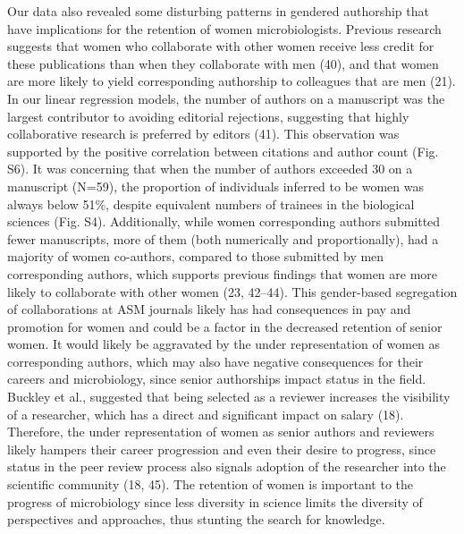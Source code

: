 \documentclass[11pt,]{article}
\begin{document}
Our data also revealed some disturbing patterns in gendered authorship
that have implications for the retention of women microbiologists.
Previous research suggests that women who collaborate with other women
receive less credit for these publications than when they collaborate
with men (40), and that women are more likely to yield corresponding
authorship to colleagues that are men (21). In our linear regression
models, the number of authors on a manuscript was the largest
contributor to avoiding editorial rejections, suggesting that highly
collaborative research is preferred by editors (41). This observation
was supported by the positive correlation between citations and author
count (Fig. S6). It was concerning that when the number of authors
exceeded 30 on a manuscript (N=59), the proportion of individuals
inferred to be women was always below 51\%, despite equivalent numbers
of trainees in the biological sciences (Fig. S4). Additionally, while
women corresponding authors submitted fewer manuscripts, more of them
(both numerically and proportionally), had a majority of women
co-authors, compared to those submitted by men corresponding authors,
which supports previous findings that women are more likely to
collaborate with other women (23, 42--44). This gender-based segregation
of collaborations at ASM journals likely has had consequences in pay and
promotion for women and could be a factor in the decreased retention of
senior women. It would likely be aggravated by the under representation
of women as corresponding authors, which may also have negative
consequences for their careers and microbiology, since senior
authorships impact status in the field. Buckley et al., suggested that
being selected as a reviewer increases the visibility of a researcher,
which has a direct and significant impact on salary (18). Therefore, the
under representation of women as senior authors and reviewers likely
hampers their career progression and even their desire to progress,
since status in the peer review process also signals adoption of the
researcher into the scientific community (18, 45). The retention of
women is important to the progress of microbiology since less diversity
in science limits the diversity of perspectives and approaches, thus
stunting the search for knowledge.
\end{document}

